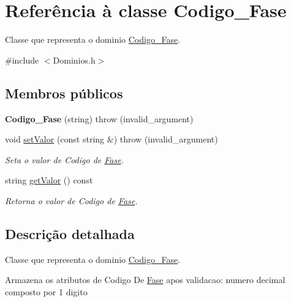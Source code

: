 \hypertarget{class_codigo___fase}{
\section{\-Referência à classe \-Codigo\-\_\-\-Fase}
\label{class_codigo___fase}
}


\-Classe que representa o dominio \hyperlink{class_codigo___fase}{\-Codigo\-\_\-\-Fase}.  




{\ttfamily \#include $<$\-Dominios.\-h$>$}

\subsection*{\-Membros públicos}
\begin{DoxyCompactItemize}
\item 
\hypertarget{class_codigo___fase_a95e4aaa46eb3c9508216d9914f10de9b}{
{\bfseries \-Codigo\-\_\-\-Fase} (string)  throw (invalid\-\_\-argument)}
\label{class_codigo___fase_a95e4aaa46eb3c9508216d9914f10de9b}

\item 
void \hyperlink{class_codigo___fase_a30ddd9595c79d2ba10d25a857ae01704}{set\-Valor} (const string \&)  throw (invalid\-\_\-argument)
\begin{DoxyCompactList}\small\item\em \-Seta o valor de \-Codigo de \hyperlink{class_fase}{\-Fase}. \end{DoxyCompactList}\item 
string \hyperlink{class_codigo___fase_ad6211e7c092a64788fe6b007addd48d3}{get\-Valor} () const 
\begin{DoxyCompactList}\small\item\em \-Retorna o valor de \-Codigo de \hyperlink{class_fase}{\-Fase}. \end{DoxyCompactList}\end{DoxyCompactItemize}


\subsection{\-Descrição detalhada}
\-Classe que representa o dominio \hyperlink{class_codigo___fase}{\-Codigo\-\_\-\-Fase}. 

\-Armazena os atributos de \-Codigo \-De \hyperlink{class_fase}{\-Fase} apos validacao\-: numero decimal composto por 1 digito 

